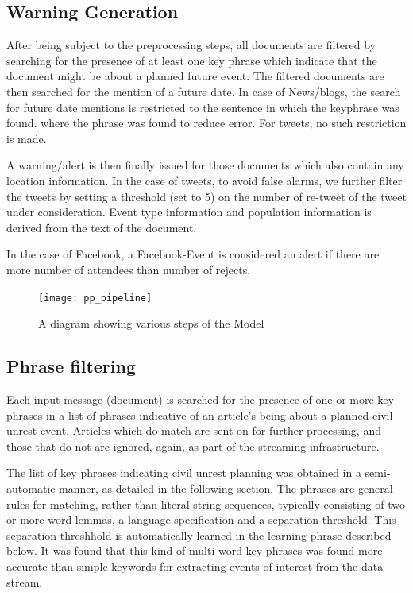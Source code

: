 \subsection{Warning Generation}
After being subject to the preprocessing steps, all documents are
filtered by searching for the presence of at least one key phrase
which indicate that the document might be about a planned
future event.  The filtered documents are then searched for the
mention of a future date. In case of News/blogs, the search for future
date mentions is restricted to the sentence in which the keyphrase was
found.  where the phrase was found to reduce error. For tweets, no
such restriction is made.

A warning/alert is then finally issued for those documents which also
contain any location information.  In the case of tweets, to avoid
false alarms, we further filter the tweets by setting a threshold (set
to 5) on the number of re-tweet of the tweet under consideration.
Event type information and population information is derived from the
text of the document.

In the case of Facebook, a Facebook-Event is considered an alert if there are more number of attendees than number of rejects.

\begin{figure}
\texttt{[image: pp\_pipeline]}
\caption{A diagram showing various steps of the Model}
\end{figure}

\subsection{Phrase filtering}

Each input message (document) is searched for the presence of one or
more key phrases in a list of phrases indicative of an article's being
about a planned civil unrest event.  Articles which do match are sent on for further processing,
and those that do not are ignored, again, as part of the streaming infrastructure.

The list of key phrases indicating civil unrest planning was obtained
in a semi-automatic manner, as detailed in the following section. The
phrases are general rules for matching, rather than literal string
sequences, typically consisting of two or more word lemmas, a language
specification and a separation threshold. This separation threshhold is automatically learned
in the learning phrase described below.  It was found that this kind of multi-word key phrases was found more accurate than simple
keywords for extracting events of interest from the data stream.

